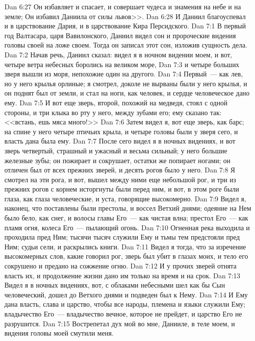 \vs Dan 6:27 Он избавляет и спасает, и совершает чудеса и знамения на небе и на земле; Он избавил Даниила от силы львов>>.
\vs Dan 6:28 И Даниил благоуспевал и в царствование Дария, и в царствование Кира Персидского.
\vs Dan 7:1 В первый год Валтасара, царя Вавилонского, Даниил видел сон и пророческие видения головы своей на ложе своем. Тогда он записал этот сон, изложив сущность дела.
\vs Dan 7:2 Начав речь, Даниил сказал: видел я в ночном видении моем, и вот, четыре ветра небесных боролись на великом море,
\vs Dan 7:3 и четыре больших зверя вышли из моря, непохожие один на другого.
\vs Dan 7:4 Первый~--- как лев, но у него крылья орлиные; я смотрел, доколе не вырваны были у него крылья, и он поднят был от земли, и стал на ноги, как человек, и сердце человеческое дано ему.
\vs Dan 7:5 И вот еще зверь, второй, похожий на медведя, стоял с одной стороны, и три клыка во рту у него, между зубами его; ему сказано так: <<встань, ешь мяса много!>>
\vs Dan 7:6 Затем видел я, вот еще зверь, как барс; на спине у него четыре птичьих крыла, и четыре головы были у зверя сего, и власть дана была ему.
\vs Dan 7:7 После сего видел я в ночных видениях, и вот зверь четвертый, страшный и ужасный и весьма сильный; у него большие железные зубы; он пожирает и сокрушает, остатки же попирает ногами; он отличен был от всех прежних зверей, и десять рогов было у него.
\vs Dan 7:8 Я смотрел на эти рога, и вот, вышел между ними еще небольшой рог, и три из прежних рогов с корнем исторгнуты были перед ним, и вот, в этом роге были глаза, как глаза человеческие, и уста, говорящие высокомерно.
\vs Dan 7:9 Видел я, наконец, что поставлены были престолы, и воссел Ветхий днями; одеяние на Нем было бело, как снег, и волосы главы Его~--- как чистая влна; престол Его~--- как пламя огня, колеса Его~--- пылающий огонь.
\vs Dan 7:10 Огненная река выходила и проходила пред Ним; тысячи тысяч служили Ему и тьмы тем предстояли пред Ним; судьи сели, и раскрылись книги.
\vs Dan 7:11 Видел я тогда, что за изречение высокомерных слов, какие говорил рог, зверь был убит в глазах моих, и тело его сокрушено и предано на сожжение огню.
\vs Dan 7:12 И у прочих зверей отнята власть их, и продолжение жизни дано им только на время и на срок.
\vs Dan 7:13 Видел я в ночных видениях, вот, с облаками небесными шел как бы Сын человеческий, дошел до Ветхого днями и подведен был к Нему.
\vs Dan 7:14 И Ему дана власть, слава и царство, чтобы все народы, племена и языки служили Ему; владычество Его~--- владычество вечное, которое не прейдет, и царство Его не разрушится.
\vs Dan 7:15 Вострепетал дух мой во мне, Данииле, в теле моем, и видения головы моей смутили меня.
